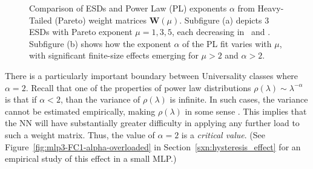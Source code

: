 
\begin{figure}[h]
    \centering  
    \caption{Comparison of ESDs and Power Law (PL) exponents $\alpha$ from Heavy-Tailed (Pareto) 
weight matrices $\mathbf{W}(\mu)$. 
Subfigure (a) depicts 3 \Typical ESDs with Pareto exponent $\mu=1,3,5$, each decreasing in \SHAPE~and \SCALE.
Subfigure (b) shows how the exponent $\alpha$ of the PL fit varies with $\mu$, with significant finite-size
effects emerging for $\mu>2$ and $\alpha>2$.
}
   \label{fig:HT-esds}
\end{figure}

There is a particularly important boundary between Universality classes where $\alpha = 2$. Recall that one of the 
properties of power law distributions $\rho(\lambda)\sim \lambda^{-\alpha}$ is that if $\alpha<2$, than the variance of 
$\rho(\lambda)$ is infinite. In such cases, the variance cannot be estimated empirically, making $\rho(\lambda)$ in 
some sense \emph{\ATypical}. This implies that the NN will have substantially greater difficulty in applying any further 
load to such a weight matrix. Thus, the value of $\alpha = 2$ is a \emph{critical value}. (See 
Figure~\ref{fig:mlp3-FC1-alpha-overloaded} in Section~\ref{sxn:hysteresis_effect} for an empirical study of this effect 
in a small MLP.)

